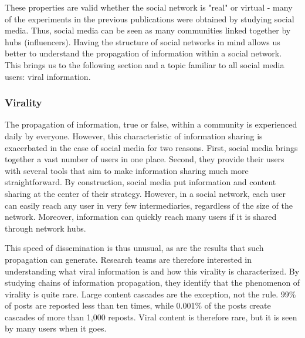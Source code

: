 These properties are valid whether the social network is "real" or virtual - many of the experiments in the previous publications were obtained by studying social media.
Thus, social media can be seen as many communities linked together by hubs (influencers).
Having the structure of social networks in mind allows us better to understand the propagation of information within a social network.
This brings us to the following section and a topic familiar to all social media users: viral information.

\subsubsection{Virality}
The propagation of information, true or false, within a community is experienced daily by everyone.
However, this characteristic of information sharing is exacerbated in the case of social media for two reasons.
First, social media brings together a vast number of users in one place.
Second, they provide their users with several tools that aim to make information sharing much more straightforward.
By construction, social media put information and content sharing at the center of their strategy.
However, in a social network, each user can easily reach any user in very few intermediaries, regardless of the size of the network.
Moreover, information can quickly reach many users if it is shared through network hubs.

This speed of dissemination is thus unusual, as are the results that such propagation can generate.
Research teams are therefore interested in understanding what viral information is and how this virality is characterized.
By studying chains of information propagation, they identify that the phenomenon of virality is quite rare.
Large content cascades are the exception, not the rule.
99\% of posts are reposted less than ten times, while 0.001\% of the posts create cascades of more than 1,000 reposts.
Viral content is therefore rare, but it is seen by many users when it goes.

